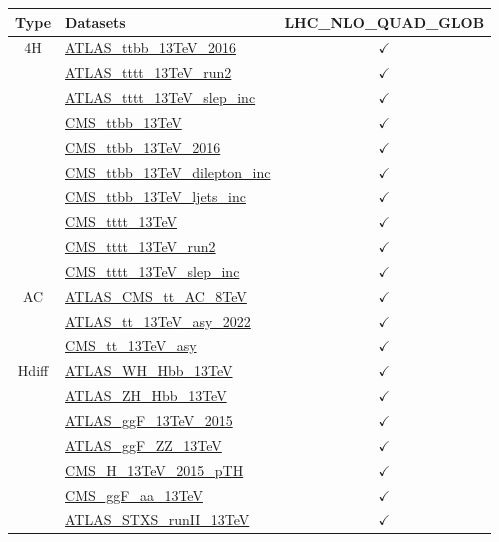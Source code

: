 \documentclass{article}
\begin{document}
\begin{longtable}{|c|l|c|}
\hline
\footnotesize
 Type & Datasets  & LHC_NLO_QUAD_GLOB \\ \hline
\multirow{10}{*}{4H}
 & \href{https://arxiv.org}{ATLAS_ttbb_13TeV_2016}  & $\checkmark$\\ \cline{2-3}
 & \href{https://arxiv.org}{ATLAS_tttt_13TeV_run2}  & $\checkmark$\\ \cline{2-3}
 & \href{https://arxiv.org}{ATLAS_tttt_13TeV_slep_inc}  & $\checkmark$\\ \cline{2-3}
 & \href{https://arxiv.org}{CMS_ttbb_13TeV}  & $\checkmark$\\ \cline{2-3}
 & \href{https://arxiv.org}{CMS_ttbb_13TeV_2016}  & $\checkmark$\\ \cline{2-3}
 & \href{https://arxiv.org}{CMS_ttbb_13TeV_dilepton_inc}  & $\checkmark$\\ \cline{2-3}
 & \href{https://arxiv.org}{CMS_ttbb_13TeV_ljets_inc}  & $\checkmark$\\ \cline{2-3}
 & \href{https://arxiv.org}{CMS_tttt_13TeV}  & $\checkmark$\\ \cline{2-3}
 & \href{https://arxiv.org}{CMS_tttt_13TeV_run2}  & $\checkmark$\\ \cline{2-3}
 & \href{https://arxiv.org}{CMS_tttt_13TeV_slep_inc}  & $\checkmark$
\\ \hline
\multirow{3}{*}{AC}
 & \href{https://arxiv.org}{ATLAS_CMS_tt_AC_8TeV}  & $\checkmark$\\ \cline{2-3}
 & \href{https://arxiv.org}{ATLAS_tt_13TeV_asy_2022}  & $\checkmark$\\ \cline{2-3}
 & \href{https://arxiv.org}{CMS_tt_13TeV_asy}  & $\checkmark$
\\ \hline
\multirow{7}{*}{Hdiff}
 & \href{https://arxiv.org}{ATLAS_WH_Hbb_13TeV}  & $\checkmark$\\ \cline{2-3}
 & \href{https://arxiv.org}{ATLAS_ZH_Hbb_13TeV}  & $\checkmark$\\ \cline{2-3}
 & \href{https://arxiv.org}{ATLAS_ggF_13TeV_2015}  & $\checkmark$\\ \cline{2-3}
 & \href{https://arxiv.org}{ATLAS_ggF_ZZ_13TeV}  & $\checkmark$\\ \cline{2-3}
 & \href{https://arxiv.org}{CMS_H_13TeV_2015_pTH}  & $\checkmark$\\ \cline{2-3}
 & \href{https://arxiv.org}{CMS_ggF_aa_13TeV}  & $\checkmark$\\ \cline{2-3}
 & \href{https://arxiv.org}{ATLAS_STXS_runII_13TeV}  & $\checkmark$
\\ \hline

\end{longtable}
\end{document}
